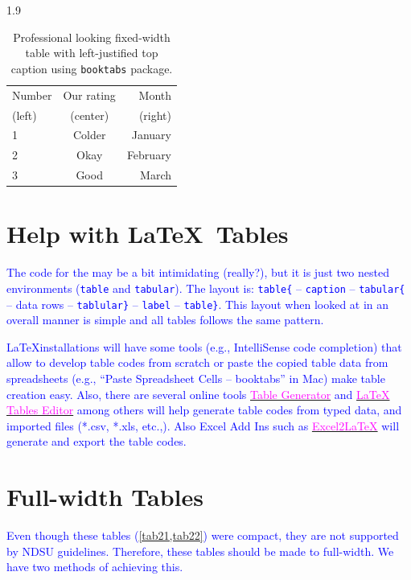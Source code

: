 \documentclass[phd]{ndsu-thesis-2022}
\newcommand\myspacing{1.9}      %
\newcommand\italk[1]{\textcolor{blue}{#1}}  %
\newcommand\vb[1]{\textcolor{blue}{\texttt{#1}}}%
\begin{document}
\begin{spacing}{\myspacing}
\begin{table}[h!]
\centering
\caption{Professional looking fixed-width table with left-justified top caption using \texttt{booktabs} package.}
\begin{tabular}{ l c r }
\toprule
Number & Our rating & Month \\
(left) & (center)   & (right)\\
\midrule
1 & Colder & January \\
2 & Okay   & February \\
3 & Good   & March\\
\bottomrule
\end{tabular}
\label{tab22}
\end{table}

\section{Help with \LaTeX\ Tables}
\italk{The code for the  may be a bit intimidating (really?), but it is just two nested environments (\vb{table} and \vb{tabular}). The layout is: \vb{table\{} -- \vb{caption} -- \vb{tabular\{} -- data rows -- \vb{tablular\}} -- \vb{label} -- \vb{table\}}. This layout when looked at in an overall manner is simple and all tables follows the same pattern.}  

\italk{\LaTeX installations will have some tools (e.g., IntelliSense code completion) that allow to develop table codes from scratch or paste the copied table data from spreadsheets (e.g., ``Paste Spreadsheet Cells -- booktabs'' in Mac) make table creation easy. Also, there are several online tools \href{https://www.tablesgenerator.com}{\textcolor{magenta}{Table Generator}} and \href{https://www.latex-tables.com}{\textcolor{magenta}{LaTeX Tables Editor}} among others will help generate table codes from typed data, and imported files (*.csv, *.xls, etc.,). Also Excel Add Ins such as \href{https://ctan.org/tex-archive/support/excel2latex?lang=en}{\textcolor{magenta}{Excel2\LaTeX}} will generate and export the table codes. 
}

\section{Full-width Tables}
\italk{Even though these tables (\cref{tab21,tab22}) were compact, they are not supported by NDSU guidelines. Therefore, these tables should be made to full-width. We have two methods of achieving this.}


\end{spacing}
\end{document}
